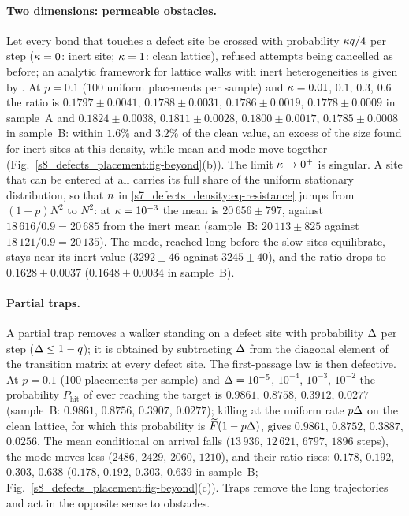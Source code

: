 \paragraph{Two dimensions: permeable obstacles.} Let every bond that touches a defect site be crossed with
probability $\kappa q/4$ per step ($\kappa=0$: inert site; $\kappa=1$: clean lattice), refused attempts being
cancelled as before; an analytic framework for lattice walks with inert heterogeneities is given by
\citet{SarvaharmanGiuggioli2023}.
At $p=0.1$ (100 uniform placements per sample) and $\kappa=0.01$, $0.1$, $0.3$, $0.6$ the ratio is
$0.1797\pm0.0041$, $0.1788\pm0.0031$, $0.1786\pm0.0019$, $0.1778\pm0.0009$ in sample~A and $0.1824\pm0.0038$,
$0.1811\pm0.0028$, $0.1800\pm0.0017$, $0.1785\pm0.0008$ in sample~B: within $1.6\%$ and $3.2\%$ of the clean
value, an excess of the size found for inert sites at this density, while mean and mode move together
(Fig.~\ref{s8_defects_placement:fig-beyond}(b)).
The limit $\kappa\to0^{+}$ is singular. A site that can be entered at all carries its full share of the uniform
stationary distribution, so that $n$ in \eqref{s7_defects_density:eq-resistance} jumps from $(1-p)N^{2}$ to
$N^{2}$: at $\kappa=10^{-3}$ the mean is $20\,656\pm797$, against $18\,616/0.9=20\,685$ from the inert mean
(sample~B: $20\,113\pm825$ against $18\,121/0.9=20\,135$). The mode, reached long before the slow sites
equilibrate, stays near its inert value ($3292\pm46$ against $3245\pm40$), and the ratio drops to
$0.1628\pm0.0037$ ($0.1648\pm0.0034$ in sample~B).

\paragraph{Partial traps.} A partial trap removes a walker standing on a defect site with probability $\Delta$ per step
($\Delta\le1-q$); it is obtained by subtracting $\Delta$ from the diagonal element of the transition matrix at every defect
site. The first-passage law is then defective. At $p=0.1$
(100 placements per sample) and $\Delta=10^{-5}$, $10^{-4}$, $10^{-3}$, $10^{-2}$ the probability
$P_{\mathrm{hit}}$ of ever reaching the target is $0.9861$, $0.8758$, $0.3912$, $0.0277$ (sample~B: $0.9861$, $0.8756$, $0.3907$, $0.0277$); killing
at the uniform rate $p\Delta$ on the clean lattice, for which this probability is $\widetilde{F}(1-p\Delta)$, gives
$0.9861$, $0.8752$, $0.3887$, $0.0256$. The mean conditional on arrival falls ($13\,936$, $12\,621$, $6797$,
$1896$ steps), the mode moves less ($2486$, $2429$, $2060$, $1210$), and their ratio rises: $0.178$, $0.192$,
$0.303$, $0.638$ ($0.178$, $0.192$, $0.303$, $0.639$ in sample~B; Fig.~\ref{s8_defects_placement:fig-beyond}(c)).
Traps remove the long trajectories and act in the opposite sense to obstacles.

